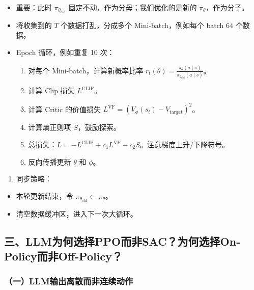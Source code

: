 \begin{itemize}
\tightlist
\item
  重要：此时 \(\pi_{\theta_{\mathrm{old}}}\) 固定不动，作为分母；我们优化的是新的 \(\pi_\theta\)，作为分子。
\item
  将收集到的 \(T\) 个数据打乱，分成多个 Mini-batch，例如每个 batch 64 个数据。
\item
  Epoch 循环，例如重复 10 次：

  \begin{enumerate}
  \def\labelenumi{\arabic{enumi}.}
  \tightlist
  \item
    对每个 Mini-batch，计算新概率比率 \(r_t(\theta)=\frac{\pi_\theta(a \mid s)}{\pi_{\theta_{\mathrm{old}}}(a \mid s)}\)。
  \item
    计算 Clip 损失 \(L^{\mathrm{CLIP}}\)。
  \item
    计算 Critic 的价值损失 \(L^{\mathrm{VF}} = (V_\phi(s_t) - V_{\mathrm{target}})^2\)。
  \item
    计算熵正则项 \(S\)，鼓励探索。
  \item
    总损失：\(L = -L^{\mathrm{CLIP}} + c_1 L^{\mathrm{VF}} - c_2 S\)。注意梯度上升/下降符号。
  \item
    反向传播更新 \(\theta\) 和 \(\phi\)。
  \end{enumerate}
\end{itemize}

\begin{enumerate}
\def\labelenumi{\arabic{enumi}.}
\setcounter{enumi}{3}
\tightlist
\item
  同步策略：
\end{enumerate}

\begin{itemize}
\tightlist
\item
  本轮更新结束，令 \(\pi_{\theta_{\mathrm{old}}} \leftarrow \pi_\theta\)。
\item
  清空数据缓冲区，进入下一次大循环。
\end{itemize}

\hypertarget{ux4e09llmux4e3aux4f55ux9009ux62e9ppoux800cux975esacux4e3aux4f55ux9009ux62e9on-policyux800cux975eoff-policy}{%
\subsection{三、LLM为何选择PPO而非SAC？为何选择On-Policy而非Off-Policy？}\label{ux4e09llmux4e3aux4f55ux9009ux62e9ppoux800cux975esacux4e3aux4f55ux9009ux62e9on-policyux800cux975eoff-policy}}

\hypertarget{ux4e00llmux8f93ux51faux79bbux6563ux800cux975eux8fdeux7eedux52a8ux4f5c}{%
\subsubsection{（一）LLM输出离散而非连续动作}\label{ux4e00llmux8f93ux51faux79bbux6563ux800cux975eux8fdeux7eedux52a8ux4f5c}}

